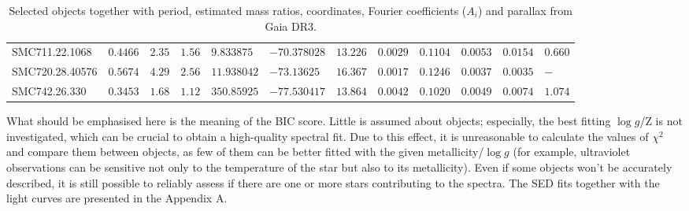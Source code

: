 \documentclass{pracalicmgr}
\begin{document}
\begin{table}[H]
{\begin{tabular}{llllllllllll}
    SMC711.22.1068  & $0.4466$  & $2.35$  & $1.56$ & $9.833875$   & $-70.378028$ & $13.226$ & $0.0029$  & $0.1104$ & $0.0053$  & $0.0154$ & $ 0.660$     \\[0.1cm]
    SMC720.28.40576 & $0.5674$ & $4.29$  & $2.56$ & $11.938042$  & $-73.13625$  & $16.367$  & $0.0017$ & $0.1246$ & $0.0037$  & $0.0035$ &  $-$    \\[0.1cm]
    SMC742.26.330   & $0.3453$ & $1.68$ & $1.12$ & $350.85925$  & $-77.530417$ & $13.864$ & $0.0042$   & $0.1020$ & $0.0049$ & $0.0074$ & $ 1.074$   \\[0.1cm]
    \hline
    \end{tabular}
    }
    \caption{Selected objects together with period, estimated mass ratios, coordinates, Fourier coefficients ($A_i$) and parallax from Gaia DR3.}\label{objects}
\end{table}
What should be emphasised here is the meaning of the BIC score. Little is assumed about objects; especially, the best fitting
$\log{g}$/Z is not investigated, which can be crucial to obtain a high-quality spectral fit. Due to this effect, it is unreasonable to calculate the values of $\chi^2$ and compare them
between objects, as few of them can be better fitted with the given metallicity/$\log{g}$
(for example, ultraviolet observations can be sensitive not only to the temperature of the star but also to its metallicity).
Even if some objects won't be accurately described, it is still possible to reliably assess if there are one or more stars contributing to the spectra.
The SED fits together with the light curves are presented in the Appendix A.
\end{document}
